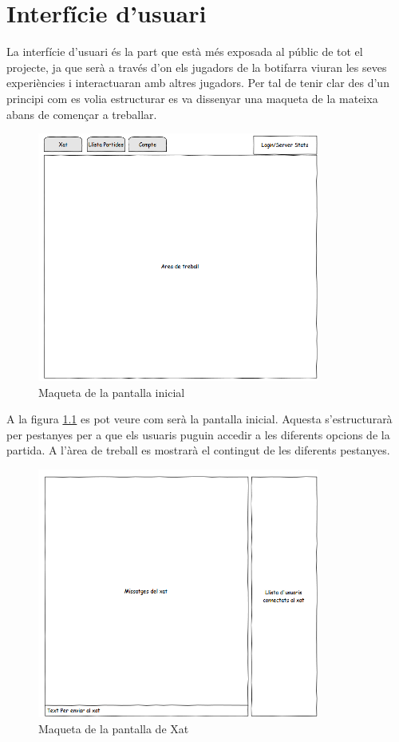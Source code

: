 \chapter{Interfície d'usuari}

La interfície d'usuari és la part que està més exposada al públic de tot el projecte, ja que serà a través d'on els jugadors de la botifarra viuran les seves experiències i interactuaran amb altres jugadors. Per tal de tenir clar des d'un principi com es volia estructurar es va dissenyar una maqueta de la mateixa abans de començar a treballar. 

\begin{figure}[htbp]
\centering\includegraphics{img/Inici.png}
\caption{Maqueta de la pantalla inicial}
\label{fig:mookup-inici}
\end{figure} 

A la figura \ref{fig:mookup-inici} es pot veure com serà la pantalla inicial. Aquesta s'estructurarà per pestanyes per a que els usuaris puguin accedir a les diferents opcions de la partida. A l'àrea de treball es mostrarà el contingut de les diferents pestanyes. 

\begin{figure}[htbp]
\centering\includegraphics{img/Xat.png}
\caption{Maqueta de la pantalla de Xat}
\label{fig:mookup-xat}
\end{figure} 

